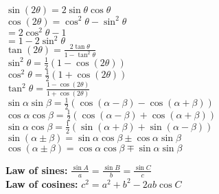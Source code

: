 \documentclass[12 pt]{article}
\begin{document}
\begin{multicols}{2}
$\sin (2 \theta) =2 \sin \theta \cos \theta$\\

$\cos (2 \theta) =\cos ^{2} \theta-\sin ^{2} \theta $\\ 
\text{\,\,\,\,\,\,\,\,\,\,\,\,\,\,\,\,\,\,\,\,}$ =2 \cos ^{2} \theta-1 $\\
\text{\,\,\,\,\,\,\,\,\,\,\,\,\,\,\,\,\,\,\,\,}$=1-2 \sin ^{2} \theta $\\

$\displaystyle \tan (2 \theta) =\frac{2 \tan \theta}{1-\tan ^{2} \theta}$\\

$\sin ^{2} \theta=\frac{1}{2}(1-\cos (2 \theta)) $\\

$\cos ^{2} \theta=\frac{1}{2}(1+\cos (2 \theta)) $\\

$\displaystyle \tan ^{2} \theta=\frac{1-\cos (2 \theta)}{1+\cos (2 \theta)}$\\

$\sin \alpha \sin \beta=\frac{1}{2}(\cos (\alpha-\beta)-\cos (\alpha+\beta)) $\\

$\cos \alpha \cos \beta=\frac{1}{2}(\cos (\alpha-\beta)+\cos (\alpha+\beta)) $\\

$\sin \alpha \cos \beta=\frac{1}{2}(\sin (\alpha+\beta)+\sin (\alpha-\beta))$\\


$\sin (\alpha \pm \beta)=\sin \alpha \cos \beta \pm \cos \alpha \sin \beta$\\

$\cos (\alpha \pm \beta)=\cos \alpha \cos \beta \mp \sin \alpha \sin \beta$\\



\begin{center}

\end{center}

\textbf{Law of sines:} $\displaystyle\frac{\sin A}{a}=\frac{\sin B}{b}=\frac{\sin C}{c}$\\

\textbf{Law of cosines:} $c^2=a^2+b^2-2ab\cos C$


\end{multicols}
\end{document}

